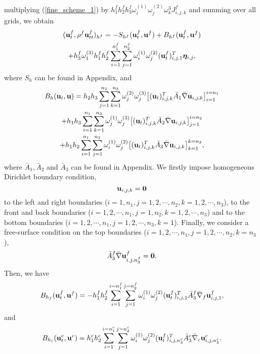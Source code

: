 \documentclass[a4paper]{article}
\begin{document}
multiplying (\ref{fine_scheme_1}) by $h_1^fh_2^fh_3^f\omega_i^{(1)}\omega_j^{(2)}\omega_k^{3}J_{i,j,k}^f$ and summing over all grids, we obtain
\begin{multline}\label{fine_simple}
({\bf u}_t^f, \rho^f{\bf u}_{tt}^f)_{h^f} = -S_{h^f}({\bf u}_t^f,{\bf u}^f) + B_{h^f}({\bf u}_t^f,{\bf u}^f) \\
+h_3^f\omega_1^{(3)}h_1^fh_2^f\sum_{i=1}^{n_1^f}\sum_{j=1}^{n_2^f}\omega_i^{(1)}\omega_j^{(2)}({\bf u}_t^f)_{i,j,1}^{T}{\bm \eta}_{i,j},
\end{multline}
where  $S_h$ can be found in Appendix, and 
\begin{multline*}
B_h({\bf u}_t, {\bf u}) = h_2h_3\sum_{j=1}^{n_2}\sum_{k=1}^{n_3}\omega_j^{(2)}\omega_j^{(3)}\big[({\bf u}_t)_{i,j,k}^{T}\bar{A}_1\bar{\nabla}{\bf u}_{i,j,k}\big]_{i=1}^{i=n_1}\\
+h_1h_3\sum_{i=1}^{n_1}\sum_{k=1}^{n_3}\omega_j^{(1)}\omega_j^{(3)}\big[({\bf u}_t)_{i,j,k}^{T}\bar{A}_2\bar{\nabla}{\bf u}_{i,j,k}\big]_{j=1}^{i=n_2}\\
+h_1h_2\sum_{i=1}^{n_1}\sum_{j=1}^{n_2}\omega_i^{(1)}\omega_j^{(2)}\big[({\bf u}_t)_{i,j,k}^{T}\bar{A}_3\bar{\nabla}{\bf u}_{i,j,k}\big]_{k=1}^{k=n_3},
\end{multline*}
where $\bar{A}_1, \bar{A}_2$ and $\bar{A}_3$ can be found in Appendix.  We firstly impose homogeneous Dirichlet boundary condition,
\begin{equation*}
{\bf u}_{i,j,k} = {\bf 0}
\end{equation*}
to the left and right boundaries ($i = 1,n_1, j = 1,2,\cdots,n_2,k = 1,2,\cdots,n_3$), to the front and back boundaries ($i = 1,2,\cdots,n_1, j = 1,n_2,k = 1,2,\cdots,n_3$) and to the bottom boundaries ($i = 1,2,\cdots,n_1, j = 1,2,\cdots,n_3, k = 1$). Finally, we consider a free-surface condition on the top boundaries ($i = 1,2,\cdots,n_1, j = 1,2,\cdots,n_2, k = n_3$),
\begin{equation*}
\bar{A}_3^f\bar{\nabla} {\bf u}_{i,j,n_3^f}^f = {\bf 0}.
\end{equation*}
Then, we have
\begin{equation}\label{boundary_f}
B_{h_f} ({\bf u}_t^f,{\bf u}^f) = -h_1^fh_2^f\sum_{i = 1}^{i = n_1^f}\sum_{j=1}^{j=n_2^f}\omega_i^{(1)}\omega_j^{(2)}({\bf u}_t^f)^T_{i,j,1}\bar{A}_3^f\bar{\nabla}_f{\bf u}^f_{i,j,1},
\end{equation}
and 
\begin{equation}\label{bounary_c}
B_{h_c} ({\bf u}_t^c,{\bf u}^c) = h_1^ch_2^c\sum_{i = 1}^{i = n_1^c}\sum_{j=1}^{j=n_2^c}\omega_i^{(1)}\omega_j^{(2)}({\bf u}_t^f)^T_{i,j,n_3^c}\bar{A}_3^c\bar{\nabla}_c{\bf u}^c_{i,j,n_3^c}.
\end{equation}
\end{document}
